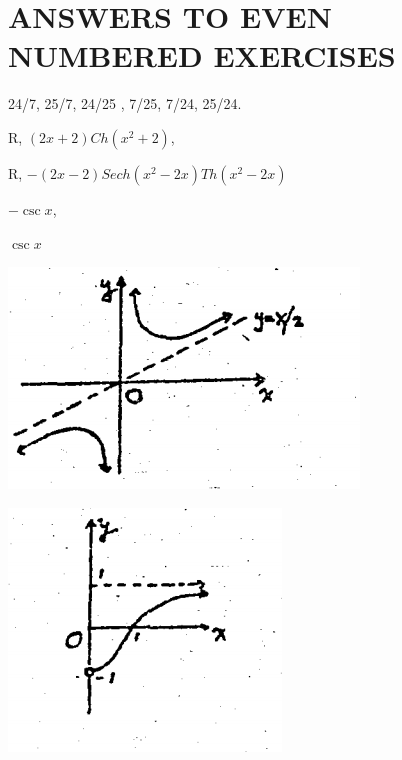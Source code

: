 \documentclass{amsbook}
\begin{document}
\section*{ANSWERS TO EVEN NUMBERED EXERCISES}
\begin{hEnumerateArabic}
    \setcounter{enumi}{5}
    \item 24/7, 25/7, 24/25 , 7/25, 7/24, 25/24.
    \setcounter{enumi}{47}
    \item 
        \begin{hEnumerateAlpha}
            \item R, $(2x + 2) Ch(x^2 + 2)$,
            \item R, $-(2x - 2) Sech(x^2 - 2x) Th(x^2 - 2x)$
        \end{hEnumerateAlpha}
    \setcounter{enumi}{51}
    \item 
        \begin{hEnumerateAlpha}
            \begin{multicols}{2}
                \item $-\csc x$,
                \columnbreak
                \item $\csc x$
            \end{multicols}
        \end{hEnumerateAlpha}
    \setcounter{enumi}{53}
    \item
        \begin{hEnumerateAlpha}
            \begin{multicols}{2}
                \item \includegraphics[align=t,scale=0.75]{images/b1p2-423-fig01.png}
                \columnbreak
                \item \includegraphics[align=t,scale=0.75]{images/b1p2-423-fig02.png}

\end{multicols}
\end{hEnumerateAlpha}
\end{hEnumerateArabic}
\end{document}
